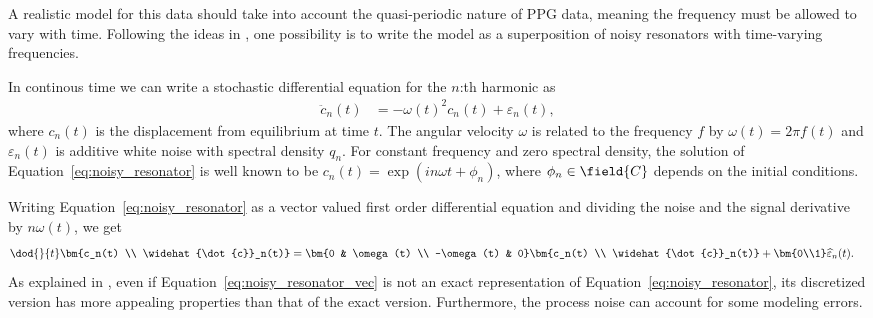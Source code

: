 A realistic model for this data 
should take into account the quasi-periodic nature of PPG data,
meaning the frequency must be allowed to vary with time.
Following the ideas in \textcite{Sarkka2012}, one possibility
is to write the model as a superposition of noisy resonators
with time-varying frequencies.

In continous time we can write a stochastic differential equation
for the $n$:th harmonic as
\begin{align}
	 \ddot{c}_n(t)&= -\omega(t)^2c_n(t)+\varepsilon_n(t),
	\label{eq:noisy_resonator}
\end{align}
where $c_n(t)$ is the displacement from equilibrium at time $t$.
The angular velocity $\omega$ is related to the frequency $f$
by $\omega(t)=2\pi f(t)$ and  $\varepsilon_n(t)$ is additive
white noise with spectral density $q_n$. For constant frequency and
zero spectral density, the solution of Equation~\eqref{eq:noisy_resonator}
is well known to be $c_n(t)=\exp(i n \omega t+\phi_n)$, where $\phi_n\in\field{C}$ depends on 
the initial conditions.

Writing Equation~\eqref{eq:noisy_resonator} as a vector valued first order differential equation
and dividing the noise and the signal derivative by $n\omega(t)$, we get
\begin{align}
	\dod{}{t}\bm{c_n(t) \\ \widehat{\dot{c}}_n(t)} &= \bm{0 & \omega(t) \\ -\omega(t) & 0}\bm{c_n(t) \\
	\widehat{\dot{c}}_n(t)}+\bm{0\\1}
	\widehat{\varepsilon}_n(t).
	\label{eq:noisy_resonator_vec}
\end{align}
As explained in \textcite{Sarkka2012}, even if Equation~\eqref{eq:noisy_resonator_vec} is not an exact
representation of Equation~\eqref{eq:noisy_resonator}, its discretized version has more appealing
properties than that of the exact version. Furthermore, the process noise can account for some
modeling errors. 

